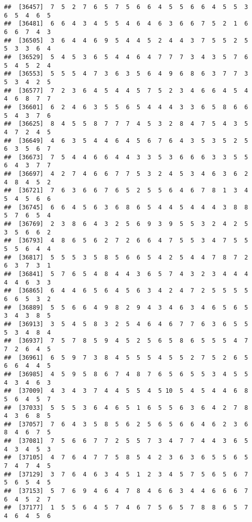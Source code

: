 \documentclass[
]{book}
\begin{document}
\begin{verbatim}
##  [36457]  7  5  2  7  6  5  7  5  6  6  4  5  5  6  6  4  5  5  3  6  5  4  6  5
##  [36481]  6  6  4  3  4  5  5  4  6  4  6  3  6  6  7  5  2  1  6  6  6  7  4  3
##  [36505]  3  6  4  4  6  9  5  4  4  5  2  4  4  3  7  5  5  2  5  5  3  3  6  4
##  [36529]  5  4  5  3  6  5  4  4  6  4  7  7  7  3  4  3  5  7  6  5  4  5  2  4
##  [36553]  5  5  5  4  7  3  6  3  5  6  4  9  6  8  6  3  7  7  3  5  3  4  2  5
##  [36577]  7  2  3  6  4  5  4  4  5  7  5  2  3  4  6  6  4  5  4  4  6  8  7  7
##  [36601]  6  2  4  6  3  5  5  6  5  4  4  4  3  3  6  5  8  6  6  5  4  3  7  6
##  [36625]  8  4  5  5  8  7  7  7  4  5  3  2  8  4  7  5  4  3  5  4  7  2  4  5
##  [36649]  4  6  3  5  4  4  6  4  5  6  7  6  4  3  5  3  5  2  5  6  3  5  6  7
##  [36673]  7  5  4  4  6  6  4  4  3  3  5  3  6  6  6  3  3  5  5  6  4  3  7  7
##  [36697]  4  2  7  4  6  6  7  7  5  3  2  4  5  3  4  6  3  6  2  4  8  4  5  2
##  [36721]  7  6  3  6  6  7  6  5  2  5  5  6  4  6  7  8  1  3  4  5  4  5  6  6
##  [36745]  6  6  4  5  6  3  6  8  6  5  4  4  5  4  4  4  3  8  8  5  7  6  5  4
##  [36769]  2  3  8  6  4  3  2  5  6  9  3  9  5  5  3  2  4  2  5  3  5  6  6  2
##  [36793]  4  8  6  5  6  2  7  2  6  6  4  7  5  5  3  4  7  5  5  5  5  6  4  4
##  [36817]  5  5  5  3  5  8  5  6  6  5  4  2  5  4  4  7  8  7  2  6  3  7  3  1
##  [36841]  5  7  6  5  4  8  4  4  3  6  5  7  4  3  2  3  4  4  4  4  4  6  3  3
##  [36865]  6  4  4  6  5  6  4  5  6  3  4  2  4  7  2  5  5  5  5  6  6  5  3  2
##  [36889]  5  5  6  6  4  9  8  2  9  4  3  4  6  3  4  6  5  6  5  3  4  3  8  5
##  [36913]  3  5  4  5  8  3  2  5  4  6  4  6  7  7  6  3  6  5  5  5  3  4  8  4
##  [36937]  7  5  7  8  5  9  4  5  2  5  6  5  8  6  5  5  5  4  7  7  2  6  4  5
##  [36961]  6  5  9  7  3  8  4  5  5  5  4  5  5  2  7  5  2  6  5  6  6  4  4  5
##  [36985]  4  5  9  5  8  6  7  4  8  7  6  5  6  5  5  3  4  5  5  4  3  4  6  3
##  [37009]  4  3  4  3  7  4  4  5  5  4  5 10  5  4  5  4  4  6  8  5  6  4  5  7
##  [37033]  5  5  5  3  6  4  6  5  1  6  5  5  6  3  6  4  2  7  8  4  3  6  8  5
##  [37057]  7  6  4  3  5  8  5  6  2  5  6  5  6  6  4  6  2  3  6  8  4  6  7  5
##  [37081]  7  5  6  6  7  7  2  5  5  7  3  4  7  7  4  4  3  6  5  4  3  4  5  3
##  [37105]  4  7  6  4  7  7  5  8  5  4  2  3  6  3  6  5  5  6  5  7  4  7  4  5
##  [37129]  3  7  6  4  6  3  4  5  1  2  3  4  5  7  5  6  5  6  7  5  6  5  4  5
##  [37153]  5  7  6  9  4  6  4  7  8  4  6  6  3  4  4  6  6  6  7  6  4  5  2  7
##  [37177]  1  5  5  6  4  5  7  4  6  7  5  6  5  7  8  8  6  5  7  4  6  4  5  6

\end{verbatim}
\end{document}
